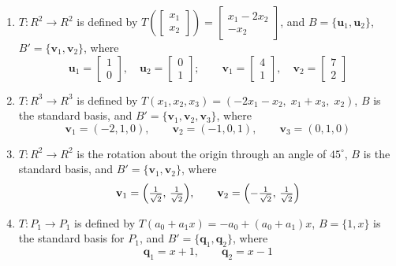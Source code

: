 \documentclass{article}
\begin{document}
\begin{enumerate}
  \item[7.] $T : R^2 \to R^2$ is defined by
        $T\!\left(\begin{bmatrix}x_1\\x_2\end{bmatrix}\right)
        = \begin{bmatrix}x_1-2x_2\\-x_2\end{bmatrix}$,
        and $B = \{\mathbf{u}_1, \mathbf{u}_2\}$, $B' = \{\mathbf{v}_1, \mathbf{v}_2\}$,
        where
        \[
          \mathbf{u}_1 = \begin{bmatrix}1\\0\end{bmatrix},\quad
          \mathbf{u}_2 = \begin{bmatrix}0\\1\end{bmatrix};\qquad
          \mathbf{v}_1 = \begin{bmatrix}4\\1\end{bmatrix},\quad
          \mathbf{v}_2 = \begin{bmatrix}7\\2\end{bmatrix}
        \]

  \item[9.] $T : R^3 \to R^3$ is defined by
        $T(x_1,x_2,x_3) = (-2x_1-x_2,\;x_1+x_3,\;x_2)$,
        $B$ is the standard basis, and $B' = \{\mathbf{v}_1, \mathbf{v}_2, \mathbf{v}_3\}$,
        where
        \[
          \mathbf{v}_1 = (-2,1,0),\qquad \mathbf{v}_2 = (-1,0,1),\qquad \mathbf{v}_3 = (0,1,0)
        \]

  \item[11.] $T : R^2 \to R^2$ is the rotation about the origin through an angle of $45^\circ$,
        $B$ is the standard basis, and $B' = \{\mathbf{v}_1, \mathbf{v}_2\}$, where
        \[
          \mathbf{v}_1 = \Bigl(\tfrac{1}{\sqrt{2}},\,\tfrac{1}{\sqrt{2}}\Bigr),\qquad
          \mathbf{v}_2 = \Bigl(-\tfrac{1}{\sqrt{2}},\,\tfrac{1}{\sqrt{2}}\Bigr)
        \]

  \item[13.] $T : P_1 \to P_1$ is defined by $T(a_0+a_1 x) = -a_0+(a_0+a_1)x$,
        $B = \{1,x\}$ is the standard basis for $P_1$, and $B' = \{\mathbf{q}_1, \mathbf{q}_2\}$,
        where
        \[
          \mathbf{q}_1 = x+1,\qquad \mathbf{q}_2 = x-1
        \]

\end{enumerate}
\end{document}

